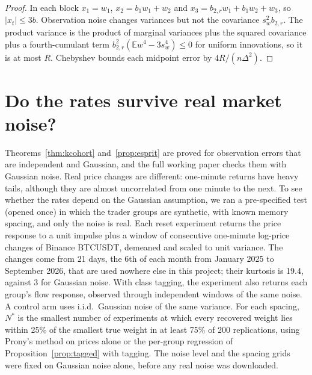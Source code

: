 \documentclass[12pt]{article}
\theoremstyle{definition}
\theoremstyle{remark}
\newcommand{\E}{\mathbb{E}}
\begin{document}
\begin{proof} In each block $x_1=w_1$, $x_2=b_1w_1+w_2$ and $x_3=b_{2,r}w_1+b_1w_2+w_3$, so $|x_t|\le3b$. Observation noise changes variances but not the covariance $s_w^2b_{2,r}$. The product variance is the product of marginal variances plus the squared covariance plus a fourth-cumulant term $b_{2,r}^2(\E w^4-3s_w^4)\le0$ for uniform innovations, so it is at most $R$. Chebyshev bounds each midpoint error by $4R/(n\Delta^2)$.
\end{proof}

\section{Do the rates survive real market noise?}\label{sec:injection}

Theorems~\ref{thm:kcohort} and~\ref{prop:esprit} are proved for observation errors that are independent and Gaussian, and the full working paper checks them with Gaussian noise. Real price changes are different: one-minute returns have heavy tails, although they are almost uncorrelated from one minute to the next. To see whether the rates depend on the Gaussian assumption, we ran a pre-specified test (opened once) in which the trader groups are synthetic, with known memory spacing, and only the noise is real. Each reset experiment returns the price response to a unit impulse plus a window of consecutive one-minute log-price changes of Binance BTCUSDT, demeaned and scaled to unit variance. The changes come from 21 days, the 6th of each month from January 2025 to September 2026, that are used nowhere else in this project; their kurtosis is 19.4, against 3 for Gaussian noise. With class tagging, the experiment also returns each group's flow response, observed through independent windows of the same noise. A control arm uses i.i.d.\ Gaussian noise of the same variance. For each spacing, $N^*$ is the smallest number of experiments at which every recovered weight lies within 25\% of the smallest true weight in at least 75\% of 200 replications, using Prony's method on prices alone or the per-group regression of Proposition~\ref{prop:tagged} with tagging. The noise level and the spacing grids were fixed on Gaussian noise alone, before any real noise was downloaded.
\end{document}
